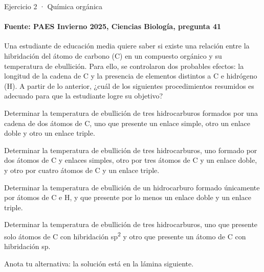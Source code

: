 \documentclass[aspectratio=169,11pt]{beamer}
\newcommand{\alternativa}[2]{\begin{opcion}\tecla{#1}\hspace{0.6em}#2\end{opcion}}
\newlength{\ajustealto}
\newenvironment{ajustar}[1][0.74\textheight]
  {\setlength{\ajustealto}{#1}\begin{lrbox}{\ajustecaja}\begin{minipage}{\textwidth}}
  {\end{minipage}\end{lrbox}%
   \ifdim\dimexpr\ht\ajustecaja+\dp\ajustecaja\relax>\ajustealto
     \resizebox*{!}{\ajustealto}{\usebox{\ajustecaja}}\else\usebox{\ajustecaja}\fi}
\begin{document}
\begin{frame}{Ejercicio 2 · Química orgánica}
\framesubtitle{Fuente: PAES Invierno 2025, Ciencias Biología, pregunta 41}
\begin{ajustar}[0.7\textheight]
{\small Una estudiante de educación media quiere saber si existe una relación entre la hibridación del átomo de carbono (C) en un compuesto orgánico y su temperatura de ebullición. Para ello, se controlaron dos probables efectos: la longitud de la cadena de C y la presencia de elementos distintos a C e hidrógeno (H). A partir de lo anterior, ¿cuál de los siguientes procedimientos resumidos es adecuado para que la estudiante logre su objetivo?}
\vspace{0.4em}
\alternativa{A}{Determinar la temperatura de ebullición de tres hidrocarburos formados por una cadena de dos átomos de C, uno que presente un enlace simple, otro un enlace doble y otro un enlace triple.}
\alternativa{B}{Determinar la temperatura de ebullición de tres hidrocarburos, uno formado por dos átomos de C y enlaces simples, otro por tres átomos de C y un enlace doble, y otro por cuatro átomos de C y un enlace triple.}
\alternativa{C}{Determinar la temperatura de ebullición de un hidrocarburo formado únicamente por átomos de C e H, y que presente por lo menos un enlace doble y un enlace triple.}
\alternativa{D}{Determinar la temperatura de ebullición de tres hidrocarburos, uno que presente solo átomos de C con hibridación sp\textsuperscript{2} y otro que presente un átomo de C con hibridación sp.}
\end{ajustar}
\vfill{\tiny\color{zinc500}\hfill Anota tu alternativa: la solución está en la lámina siguiente.}
\end{frame}
\end{document}
